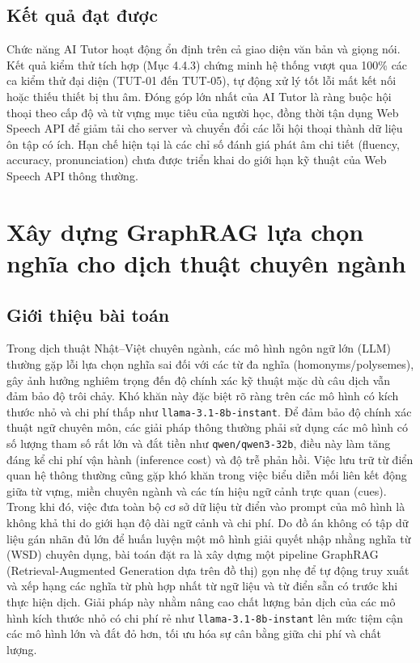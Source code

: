 \documentclass[../DoAn.tex]{subfiles}
\begin{document}
\subsection{Kết quả đạt được}
\label{subsection:5.4.3}

Chức năng AI Tutor hoạt động ổn định trên cả giao diện văn bản và giọng nói. Kết quả kiểm thử tích hợp (Mục 4.4.3) chứng minh hệ thống vượt qua 100\% các ca kiểm thử đại diện (TUT-01 đến TUT-05), tự động xử lý tốt lỗi mất kết nối hoặc thiếu thiết bị thu âm. Đóng góp lớn nhất của AI Tutor là ràng buộc hội thoại theo cấp độ và từ vựng mục tiêu của người học, đồng thời tận dụng Web Speech API để giảm tải cho server và chuyển đổi các lỗi hội thoại thành dữ liệu ôn tập có ích. Hạn chế hiện tại là các chỉ số đánh giá phát âm chi tiết (fluency, accuracy, pronunciation) chưa được triển khai do giới hạn kỹ thuật của Web Speech API thông thường.

\section{Xây dựng GraphRAG lựa chọn nghĩa cho dịch thuật chuyên ngành}
\label{section:5.5}

\subsection{Giới thiệu bài toán}
\label{subsection:5.5.1}

Trong dịch thuật Nhật--Việt chuyên ngành, các mô hình ngôn ngữ lớn (LLM) thường gặp lỗi lựa chọn nghĩa sai đối với các từ đa nghĩa (homonyms/polysemes), gây ảnh hưởng nghiêm trọng đến độ chính xác kỹ thuật mặc dù câu dịch vẫn đảm bảo độ trôi chảy. Khó khăn này đặc biệt rõ ràng trên các mô hình có kích thước nhỏ và chi phí thấp như \texttt{llama-3.1-8b-instant}. Để đảm bảo độ chính xác thuật ngữ chuyên môn, các giải pháp thông thường phải sử dụng các mô hình có số lượng tham số rất lớn và đắt tiền như \texttt{qwen/qwen3-32b}, điều này làm tăng đáng kể chi phí vận hành (inference cost) và độ trễ phản hồi. Việc lưu trữ từ điển quan hệ thông thường cũng gặp khó khăn trong việc biểu diễn mối liên kết động giữa từ vựng, miền chuyên ngành và các tín hiệu ngữ cảnh trực quan (cues). Trong khi đó, việc đưa toàn bộ cơ sở dữ liệu từ điển vào prompt của mô hình là không khả thi do giới hạn độ dài ngữ cảnh và chi phí. Do đồ án không có tập dữ liệu gán nhãn đủ lớn để huấn luyện một mô hình giải quyết nhập nhằng nghĩa từ (WSD) chuyên dụng, bài toán đặt ra là xây dựng một pipeline GraphRAG (Retrieval-Augmented Generation dựa trên đồ thị) gọn nhẹ để tự động truy xuất và xếp hạng các nghĩa từ phù hợp nhất từ ngữ liệu và từ điển sẵn có trước khi thực hiện dịch. Giải pháp này nhằm nâng cao chất lượng bản dịch của các mô hình kích thước nhỏ có chi phí rẻ như \texttt{llama-3.1-8b-instant} lên mức tiệm cận các mô hình lớn và đắt đỏ hơn, tối ưu hóa sự cân bằng giữa chi phí và chất lượng.
\end{document}
